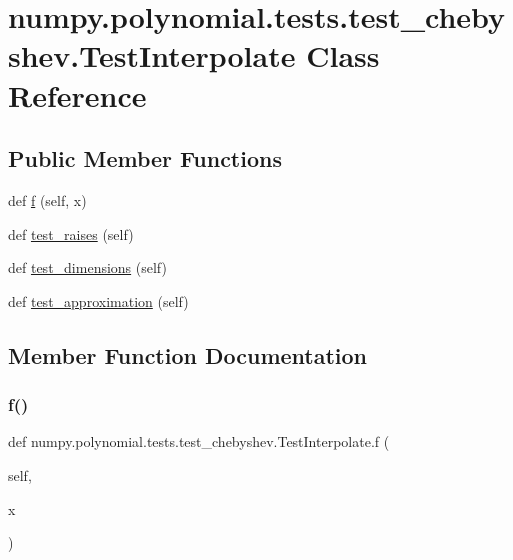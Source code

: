 \hypertarget{classnumpy_1_1polynomial_1_1tests_1_1test__chebyshev_1_1TestInterpolate}{}\section{numpy.\+polynomial.\+tests.\+test\+\_\+chebyshev.\+Test\+Interpolate Class Reference}
\label{classnumpy_1_1polynomial_1_1tests_1_1test__chebyshev_1_1TestInterpolate}
\subsection*{Public Member Functions}
\begin{DoxyCompactItemize}
\item 
def \hyperlink{classnumpy_1_1polynomial_1_1tests_1_1test__chebyshev_1_1TestInterpolate_a0ba36bb958e3725785a2ba5b36772352}{f} (self, x)
\item 
def \hyperlink{classnumpy_1_1polynomial_1_1tests_1_1test__chebyshev_1_1TestInterpolate_a111e90e5c5e7a837bc7a200b05088c17}{test\+\_\+raises} (self)
\item 
def \hyperlink{classnumpy_1_1polynomial_1_1tests_1_1test__chebyshev_1_1TestInterpolate_aeacf0c6d0bdd3fa7a5c9bb4decf819f8}{test\+\_\+dimensions} (self)
\item 
def \hyperlink{classnumpy_1_1polynomial_1_1tests_1_1test__chebyshev_1_1TestInterpolate_a336afdbcd56825fdeb911de3eb324aec}{test\+\_\+approximation} (self)
\end{DoxyCompactItemize}


\subsection{Member Function Documentation}
\mbox{\label{classnumpy_1_1polynomial_1_1tests_1_1test__chebyshev_1_1TestInterpolate_a0ba36bb958e3725785a2ba5b36772352}} 
\subsubsection{\texorpdfstring{f()}{f()}}
{\footnotesize\ttfamily def numpy.\+polynomial.\+tests.\+test\+\_\+chebyshev.\+Test\+Interpolate.\+f (\begin{DoxyParamCaption}\item[{}]{self,  }\item[{}]{x }\end{DoxyParamCaption})}

